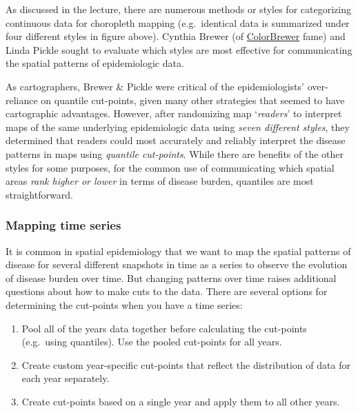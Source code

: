 \documentclass[
]{book}
\providecommand{\tightlist}{%
  \setlength{\itemsep}{0pt}\setlength{\parskip}{0pt}}
\begin{document}
As discussed in the lecture, there are numerous methods or styles for categorizing continuous data for choropleth mapping (e.g.~identical data is summarized under four different styles in figure above). Cynthia Brewer (of \href{https://colorbrewer2.org/\#type=sequential\&scheme=BuGn\&n=3}{ColorBrewer} fame) and Linda Pickle \citeyearpar{brewer_evaluation_2002} sought to evaluate which styles are most effective for communicating the spatial patterns of epidemiologic data.

As cartographers, Brewer \& Pickle were critical of the epidemiologists' over-reliance on quantile cut-points, given many other strategies that seemed to have cartographic advantages. However, after randomizing map `\emph{readers}' to interpret maps of the same underlying epidemiologic data using \emph{seven different styles}, they determined that readers could most accurately and reliably interpret the disease patterns in maps using \emph{quantile cut-points}. While there are benefits of the other styles for some purposes, for the common use of communicating which spatial areas \emph{rank higher or lower} in terms of disease burden, quantiles are most straightforward.

\hypertarget{mapping-time-series}{%
\subsubsection{Mapping time series}\label{mapping-time-series}}

It is common in spatial epidemiology that we want to map the spatial patterns of disease for several different snapshots in time as a series to observe the evolution of disease burden over time. But changing patterns over time raises additional questions about how to make cuts to the data. There are several options for determining the cut-points when you have a time series:

\begin{enumerate}
\def\labelenumi{\arabic{enumi}.}
\tightlist
\item
  Pool all of the years data together before calculating the cut-points (e.g.~using quantiles). Use the pooled cut-points for all years.
\item
  Create custom year-specific cut-points that reflect the distribution of data for each year separately.
\item
  Create cut-points based on a single year and apply them to all other years.
\end{enumerate}
\end{document}
